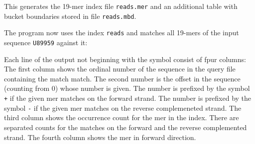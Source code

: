 \documentclass[12pt]{article}
\newcommand{\TYsearch}[0]{\Programname{tallymer-search}\xspace}
\begin{document}

This generates the 19-mer index file \texttt{reads.mer} and an additional
table with bucket boundaries stored in file \texttt{reads.mbd}.

The program \TYsearch now uses the index \texttt{reads} and
matches all 19-mers of the input sequence \texttt{U89959} against it:


Each line of the output not beginning with the symbol \texttt{}
consist of fpur columns: The first column shows the ordinal number of the
sequence in the query file containing the match match. The second number
is the offset in the sequence (counting from 0) whose number is given.
The number is prefixed by the symbol \texttt{+} if the given mer
matches on the forward strand.
The number is prefixed by the symbol \texttt{-} if the given mer
matches on the reverse complemeneted strand. The third column shows
the occurrence count for the mer in the index. There are separated 
counts for the matches on the forward and the reverse complemented strand.
The fourth column shows the mer in forward direction. 


\end{document}
